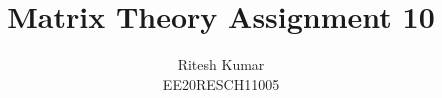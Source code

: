 \documentclass[journal,12pt,twocolumn]{IEEEtran}
\DeclareMathOperator*{\Res}{Res}
\begin{document}
	
	
	\newtheorem{theorem}{Theorem}[section]
	\newtheorem{problem}{Problem}
	\newtheorem{proposition}{Proposition}[section]
	\newtheorem{lemma}{Lemma}[section]
	\newtheorem{corollary}[theorem]{Corollary}
	\newtheorem{example}{Example}[section]
	\newtheorem{definition}[problem]{Definition}
	
	\newcommand{\BEQA}{\begin{eqnarray}}
	\newcommand{\EEQA}{\end{eqnarray}}
	\newcommand{\define}{\stackrel{\triangle}{=}}
	
	\providecommand{\mbf}{\mathbf}
	\providecommand{\pr}[1]{\ensuremath{\Pr\left(#1\right)}}
	\providecommand{\qfunc}[1]{\ensuremath{Q\left(#1\right)}}
	\providecommand{\sbrak}[1]{\ensuremath{{}\left[#1\right]}}
	\providecommand{\lsbrak}[1]{\ensuremath{{}\left[#1\right.}}
	\providecommand{\rsbrak}[1]{\ensuremath{{}\left.#1\right]}}
	\providecommand{\brak}[1]{\ensuremath{\left(#1\right)}}
	\providecommand{\lbrak}[1]{\ensuremath{\left(#1\right.}}
	\providecommand{\rbrak}[1]{\ensuremath{\left.#1\right)}}
	\providecommand{\cbrak}[1]{\ensuremath{\left\{#1\right\}}}
	\providecommand{\lcbrak}[1]{\ensuremath{\left\{#1\right.}}
	\providecommand{\rcbrak}[1]{\ensuremath{\left.#1\right\}}}
	\theoremstyle{remark}
	\newtheorem{rem}{Remark}
	\newcommand{\sgn}{\mathop{\mathrm{sgn}}}
	\providecommand{\abs}[1]{\left\vert#1\right\vert}
	\providecommand{\res}[1]{\Res\displaylimits_{#1}} 
	\providecommand{\norm}[1]{\left\lVert#1\right\rVert}
	\providecommand{\mtx}[1]{\mathbf{#1}}
	\providecommand{\mean}[1]{E\left[ #1 \right]}
	\providecommand{\fourier}{\overset{\mathcal{F}}{ \rightleftharpoons}}
	\providecommand{\system}{\overset{\mathcal{H}}{ \longleftrightarrow}}
	\newcommand{\solution}{\noindent \textbf{Solution: }}
	\newcommand{\cosec}{\,\text{cosec}\,}
	\providecommand{\dec}[2]{\ensuremath{\overset{#1}{\underset{#2}{\gtrless}}}}
	\newcommand{\myvec}[1]{\ensuremath{\begin{pmatrix}#1\end{pmatrix}}}
	\newcommand{\mydet}[1]{\ensuremath{\begin{vmatrix}#1\end{vmatrix}}}
	\makeatletter
	\makeatother
	\let\StandardTheFigure\thefigure
	\let\vec\mathbf
	\renewcommand{\thefigure}{\theproblem}
	\def\putbox#1#2#3{\makebox[0in][l]{\makebox[#1][l]{}\raisebox{\baselineskip}[0in][0in]{\raisebox{#2}[0in][0in]{#3}}}}
	\def\rightbox#1{\makebox[0in][r]{#1}}
	\def\centbox#1{\makebox[0in]{#1}}
	\def\topbox#1{\raisebox{-\baselineskip}[0in][0in]{#1}}
	\def\midbox#1{\raisebox{-0.5\baselineskip}[0in][0in]{#1}}
	\vspace{3cm}
	\title{Matrix Theory Assignment 10}
	\author{Ritesh Kumar \\ EE20RESCH11005}
	
\end{document}
